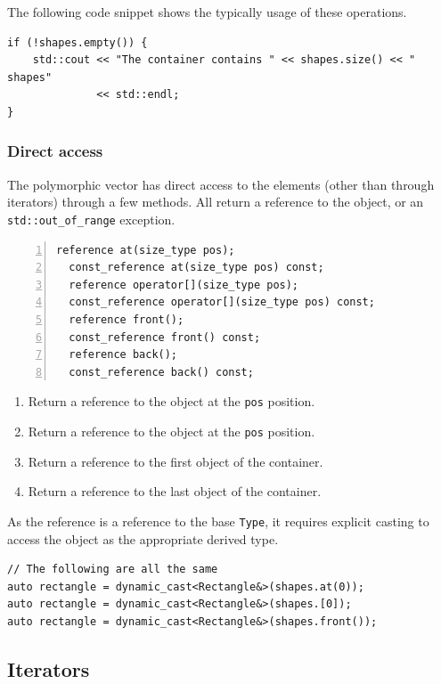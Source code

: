 \documentclass[10pt,a4paper,openany]{mudbook}
\newenvironment{enumeratedef}
  {\begin{enumerate}[topsep=0.5em,itemsep=0em,parsep=0em,font=\small]
     \small}
  {\end{enumerate}}
\begin{document}
The following code snippet shows the typically usage of these operations.
  
\begin{lstlisting}[style=snippet]
if (!shapes.empty()) {
    std::cout << "The container contains " << shapes.size() << " shapes"
              << std::endl;
}
\end{lstlisting}

\subsubsection{Direct access}

The polymorphic vector has direct access to the elements (other than through
iterators) through a few methods. All return a reference to the object, or
an \texttt{std::out\_of\_range} exception.

\begin{lstlisting}[style=definition,numbers=left]
  reference at(size_type pos);
  const_reference at(size_type pos) const;
  reference operator[](size_type pos);
  const_reference operator[](size_type pos) const;
  reference front();
  const_reference front() const;
  reference back();
  const_reference back() const;
\end{lstlisting}
\begin{enumeratedef}
  \item[1-2] Return a reference to the object at the \texttt{pos} position.
  \item[3-4] Return a reference to the object at the \texttt{pos} position.
  \item[5-6] Return a reference to the first object of the container.
  \item[7-8] Return a reference to the last object of the container.
\end{enumeratedef}

As the reference is a reference to the base \texttt{Type}, it requires
explicit casting to access the object as the appropriate derived type.

\begin{lstlisting}[style=snippet]
// The following are all the same
auto rectangle = dynamic_cast<Rectangle&>(shapes.at(0));
auto rectangle = dynamic_cast<Rectangle&>(shapes.[0]);
auto rectangle = dynamic_cast<Rectangle&>(shapes.front());
\end{lstlisting}

\subsection{Iterators}
\end{document}
